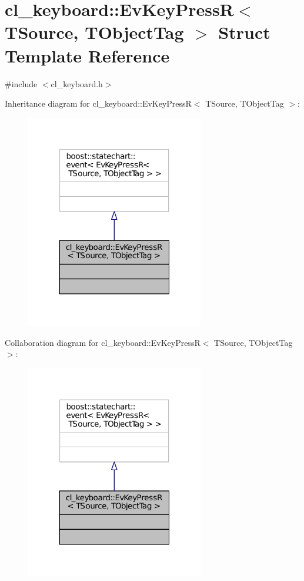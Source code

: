 \hypertarget{structcl__keyboard_1_1EvKeyPressR}{}\section{cl\+\_\+keyboard\+:\+:Ev\+Key\+PressR$<$ T\+Source, T\+Object\+Tag $>$ Struct Template Reference}
\label{structcl__keyboard_1_1EvKeyPressR}


{\ttfamily \#include $<$cl\+\_\+keyboard.\+h$>$}



Inheritance diagram for cl\+\_\+keyboard\+:\+:Ev\+Key\+PressR$<$ T\+Source, T\+Object\+Tag $>$\+:
\nopagebreak
\begin{figure}[H]
\begin{center}
\leavevmode
\includegraphics[width=220pt]{structcl__keyboard_1_1EvKeyPressR__inherit__graph}
\end{center}
\end{figure}


Collaboration diagram for cl\+\_\+keyboard\+:\+:Ev\+Key\+PressR$<$ T\+Source, T\+Object\+Tag $>$\+:
\nopagebreak
\begin{figure}[H]
\begin{center}
\leavevmode
\includegraphics[width=220pt]{structcl__keyboard_1_1EvKeyPressR__coll__graph}
\end{center}
\end{figure}


